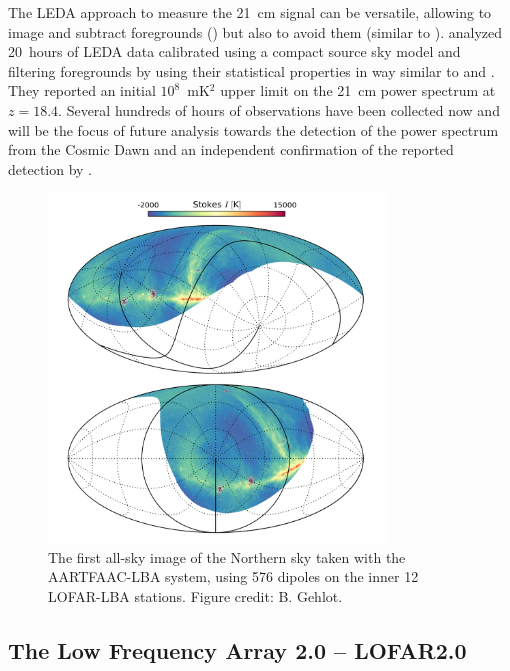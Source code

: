 %
The LEDA approach to measure the 21~cm signal can be versatile, allowing to image and subtract foregrounds (\cite{eastwood18}) but also to avoid them (similar to \cite{beardsley16}). \cite{eastwood19} analyzed 20~hours of LEDA data calibrated using a compact source sky model and filtering foregrounds by using their statistical properties in way similar to \cite{dillon14} and \cite{trott16}. They reported an initial $10^8$~mK$^2$ upper limit on the 21~cm power spectrum at $z = 18.4$. Several hundreds of hours of observations have been collected now and will be the focus of future analysis towards the detection of the power spectrum from the Cosmic Dawn and an independent confirmation of the reported detection by \cite{bowman18}.


\begin{figure}[t]
\begin{center}
\includegraphics[width=0.8\textwidth]{Koopmans_Bernardi/AARTFAAC=LBA-12-all-sky.png}
\end{center}
\caption{The first all-sky image of the Northern sky taken with the AARTFAAC-LBA system, using 576 dipoles on the inner 12 LOFAR-LBA stations. Figure credit: B. Gehlot.}
\label{fig:fig_AARTFAAC}
\end{figure}

\subsection{The Low Frequency Array 2.0 -- LOFAR2.0}
\label{section:lofar}

